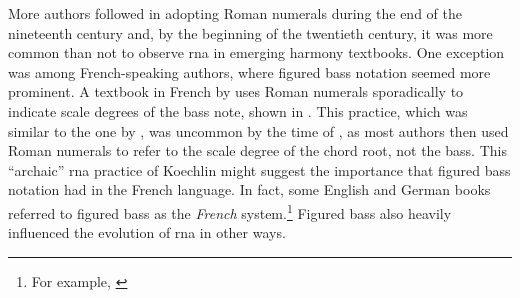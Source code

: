 

More authors followed in adopting Roman numerals during the
end of the nineteenth century and, by the beginning of the
twentieth century, it was more common than not to observe
\gls{rna} in emerging harmony textbooks. One exception was
among French-speaking authors, where figured bass notation
seemed more prominent. A textbook in French by
\textcite{koechlin1928traite} uses Roman numerals
sporadically to indicate scale degrees of the bass note,
shown in .
This practice, which was similar to the one by
\textcite{hamilton1840catechism}, was uncommon by the time
of \textcite{koechlin1928traite}, as most authors then used
Roman numerals to refer to the scale degree of the chord
root, not the bass. This ``archaic'' \gls{rna} practice of
Koechlin might suggest the importance that figured bass
notation had in the French language. In fact, some English
and German books referred to figured bass as the
\emph{French} system.\footnote{For example,
\textcite{norris1894practical}} Figured bass also heavily
influenced the evolution of \gls{rna} in other ways.

